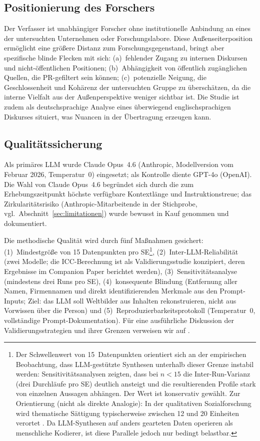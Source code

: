 \documentclass[12pt,a4paper]{article}
\begin{document}
\subsection{Positionierung des Forschers}
\label{sec:methodik:positionierung}

Der Verfasser ist unabh\"angiger Forscher ohne institutionelle Anbindung an eines der untersuchten Unternehmen oder Forschungslabore. Diese Au\ss{}enseiterposition erm\"oglicht eine gr\"o\ss{}ere Distanz zum Forschungsgegenstand, bringt aber spezifische blinde Flecken mit sich: (a)~fehlender Zugang zu internen Diskursen und nicht-\"offentlichen Positionen; (b)~Abh\"angigkeit von \"offentlich zug\"anglichen Quellen, die PR-gefiltert sein k\"onnen; (c)~potenzielle Neigung, die Geschlossenheit und Koh\"arenz der untersuchten Gruppe zu \"ubersch\"atzen, da die interne Vielfalt aus der Au\ss{}enperspektive weniger sichtbar ist. Die Studie ist zudem als deutschsprachige Analyse eines \"uberwiegend englischsprachigen Diskurses situiert, was Nuancen in der \"Ubertragung erzeugen kann.

\subsection{Qualit\"atssicherung}
\label{sec:methodik:qualitaet}

Als prim\"ares LLM wurde Claude Opus~4.6 (Anthropic, Modellversion vom Februar 2026, Temperatur~0) eingesetzt; als Kontrolle diente GPT-4o (OpenAI). Die Wahl von Claude Opus~4.6 begr\"undet sich durch die zum Erhebungszeitpunkt h\"ochste verf\"ugbare Kontextl\"ange und Instruktionstreue; das Zirkularit\"atsrisiko (Anthropic-Mitarbeitende in der Stichprobe, vgl.\ Abschnitt~\ref{sec:limitationen}) wurde bewusst in Kauf genommen und dokumentiert.

Die methodische Qualit\"at wird durch f\"unf Ma\ss{}nahmen gesichert: (1)~Mindestgr\"o\ss{}e von 15 Datenpunkten pro SE\footnote{Der Schwellenwert von 15~Datenpunkten orientiert sich an der empirischen Beobachtung, dass LLM-gest\"utzte Synthesen unterhalb dieser Grenze instabil werden: Sensitivit\"atsanalysen zeigten, dass bei $n < 15$ die Inter-Run-Varianz (drei Durchl\"aufe pro SE) deutlich ansteigt und die resultierenden Profile stark von einzelnen Aussagen abh\"angen. Der Wert ist konservativ gew\"ahlt. Zur Orientierung (nicht als direkte Analogie): In der qualitativen Sozialforschung wird thematische S\"attigung typischerweise zwischen 12 und 20 Einheiten verortet \citep{Guest2006, FugardPotts2015}. Da LLM-Synthesen auf anders gearteten Daten operieren als menschliche Kodierer, ist diese Parallele jedoch nur bedingt belastbar.}, (2)~Inter-LLM-Reliabilit\"at (zwei Modelle; die ICC-Berechnung ist als Validierungsstudie konzipiert, deren Ergebnisse im Companion Paper berichtet werden), (3)~Sensitivit\"atsanalyse (mindestens drei Runs pro SE), (4)~konsequente Blindung (Entfernung aller Namen, Firmennamen und direkt identifizierenden Merkmale aus den Prompt-Inputs; Ziel: das LLM soll Weltbilder aus Inhalten rekonstruieren, nicht aus Vorwissen \"uber die Person) und (5)~Reproduzierbarkeitsprotokoll (Temperatur~0, vollst\"andige Prompt-Dokumentation). F\"ur eine ausf\"uhrliche Diskussion der Validierungsstrategien und ihrer Grenzen verweisen wir auf \citet{Geiger2026SWR}.
\end{document}
